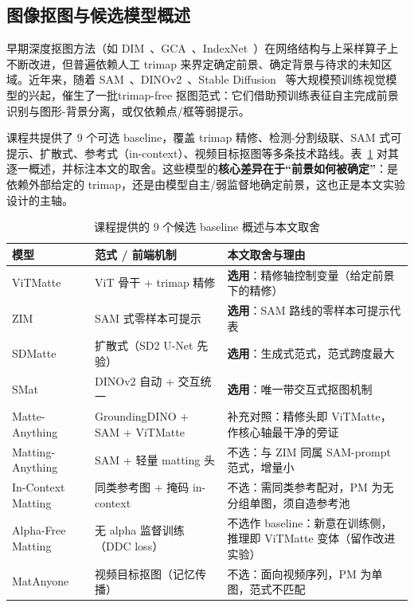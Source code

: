 \documentclass[supercite]{HustGraduPaper}
\begin{document}
	\subsection{图像抠图与候选模型概述}
	早期深度抠图方法（如 DIM~\cite{DIM}、GCA~\cite{GCA}、IndexNet~\cite{index}）在网络结构与上采样算子上不断改进，但普遍依赖人工 trimap 来界定确定前景、确定背景与待求的未知区域。近年来，随着 SAM~\cite{sam}、DINOv2~\cite{dinov2}、Stable Diffusion~\cite{ldm} 等大规模预训练视觉模型的兴起，催生了一批trimap-free 抠图范式：它们借助预训练表征自主完成前景识别与图形-背景分离，或仅依赖点/框等弱提示。

	课程共提供了 9 个可选 baseline，覆盖 trimap 精修、检测-分割级联、SAM 式可提示、扩散式、参考式（in-context）、视频目标抠图等多条技术路线。表~\ref{tab:candidates} 对其逐一概述，并标注本文的取舍。这些模型的\textbf{核心差异在于“前景如何被确定”}：是依赖外部给定的 trimap，还是由模型自主/弱监督地确定前景，这也正是本文实验设计的主轴。

	\begin{table}[ht]
		\centering
		\caption{课程提供的 9 个候选 baseline 概述与本文取舍}
		\label{tab:candidates}
		\small
		\begin{tabularx}{\linewidth}{@{}llX@{}}
			\toprule
			模型 & 范式 / 前端机制 & 本文取舍与理由 \\
			\midrule
			ViTMatte         & ViT 骨干 + trimap 精修            & \textbf{选用}：精修轴控制变量（给定前景下的精修） \\
			ZIM              & SAM 式零样本可提示              & \textbf{选用}：SAM 路线的零样本可提示代表 \\
			SDMatte          & 扩散式（SD2 U-Net 先验）         & \textbf{选用}：生成式范式，范式跨度最大 \\
			SMat             & DINOv2 自动 + 交互统一          & \textbf{选用}：唯一带交互式抠图机制 \\
			Matte-Anything   & GroundingDINO + SAM + ViTMatte  & 补充对照：精修头即 ViTMatte，作核心轴最干净的旁证 \\
			Matting-Anything & SAM + 轻量 matting 头           & 不选：与 ZIM 同属 SAM-prompt 范式，增量小 \\
			In-Context Matting & 同类参考图 + 掩码 in-context   & 不选：需同类参考配对，PM 为无分组单图，须自造参考池 \\
			Alpha-Free Matting & 无 alpha 监督训练（DDC loss）  & 不选作 baseline：新意在训练侧，推理即 ViTMatte 变体（留作改进实验） \\
			MatAnyone        & 视频目标抠图（记忆传播）        & 不选：面向视频序列，PM 为单图，范式不匹配 \\
			\bottomrule
		\end{tabularx}
	\end{table}
\end{document}
